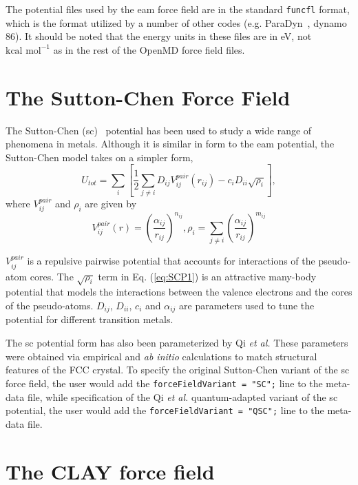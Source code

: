 \documentclass[]{book}
\begin{document}
The potential files used by the {\sc eam} force field are in the
standard {\tt funcfl} format, which is the format utilized by a number
of other codes (e.g. ParaDyn~\cite{Paradyn}, {\sc dynamo 86}).  It
should be noted that the energy units in these files are in eV, not
$\mbox{kcal mol}^{-1}$ as in the rest of the {\sc OpenMD} force field
files.  

\section{\label{section:sc}The Sutton-Chen Force Field}

The Sutton-Chen ({\sc sc})~\cite{Chen90} potential has been used to
study a wide range of phenomena in metals.  Although it is similar in
form to the {\sc eam} potential, the Sutton-Chen model takes on a
simpler form,
\begin{equation}
\label{eq:SCP1}
U_{tot}=\sum _{i}\left[ \frac{1}{2}\sum _{j\neq
i}D_{ij}V^{pair}_{ij}(r_{ij})-c_{i}D_{ii}\sqrt{\rho_{i}}\right] ,
\end{equation}
 where $V^{pair}_{ij}$ and $\rho_{i}$ are given by 
\begin{equation}
\label{eq:SCP2}
V^{pair}_{ij}(r)=\left(
\frac{\alpha_{ij}}{r_{ij}}\right)^{n_{ij}}, \rho_{i}=\sum_{j\neq i}\left(
\frac{\alpha_{ij}}{r_{ij}}\right) ^{m_{ij}}
\end{equation}

$V^{pair}_{ij}$ is a repulsive pairwise potential that accounts for
interactions of the pseudo-atom cores.  The $\sqrt{\rho_i}$ term in
Eq. (\ref{eq:SCP1}) is an attractive many-body potential that models
the interactions between the valence electrons and the cores of the
pseudo-atoms.  $D_{ij}$, $D_{ii}$, $c_i$ and $\alpha_{ij}$ are
parameters used to tune the potential for different transition
metals. 

The {\sc sc} potential form has also been parameterized by Qi {\it et
al.}\cite{Qi99} These parameters were obtained via empirical and {\it
ab initio} calculations to match structural features of the FCC
crystal.  To specify the original Sutton-Chen variant of the {\sc sc}
force field, the user would add the {\tt forceFieldVariant = "SC";}
line to the meta-data file, while specification of the Qi {\it et al.}
quantum-adapted variant of the {\sc sc} potential, the user would add
the {\tt forceFieldVariant = "QSC";} line to the meta-data file.

\section{\label{section:clay}The CLAY force field}
\end{document}
